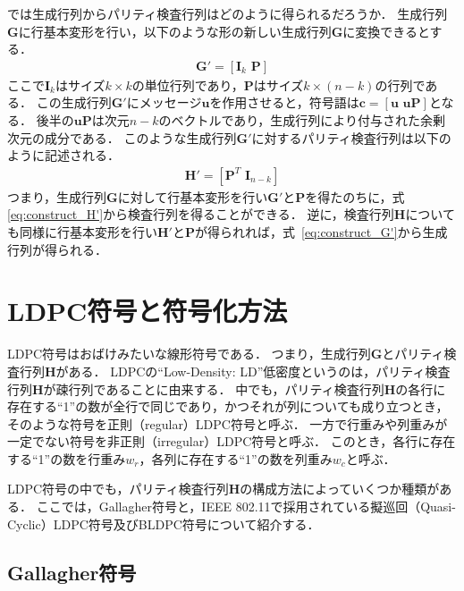 \documentclass[twocolumn, a4paper]{ieicejsp}
\begin{document}
では生成行列からパリティ検査行列はどのように得られるだろうか．
生成行列$\mathbf{G}$に行基本変形を行い，以下のような形の新しい生成行列$\mathbf{G}$に変換できるとする．
\begin{align}
  \mathbf{G}' = [\mathbf{I}_k \,\, \mathbf{P}] \label{eq:construct_G'}
\end{align}
ここで$\mathbf{I}_k$はサイズ$k \times k$の単位行列であり，$\mathbf{P}$はサイズ$k \times (n-k)$の行列である．
この生成行列$\mathbf{G}'$にメッセージ$\mathbf{u}$を作用させると，符号語は$\mathbf{c}=[\mathbf{u} \,\, \mathbf{u}\mathbf{P}]$となる．
後半の$\mathbf{u}\mathbf{P}$は次元$n-k$のベクトルであり，生成行列により付与された余剰次元の成分である．
このような生成行列$\mathbf{G}'$に対するパリティ検査行列は以下のように記述される．
\begin{align}
  \mathbf{H}' = [\mathbf{P}^T \,\, \mathbf{I}_{n-k}] \label{eq:construct_H'}
\end{align}
つまり，生成行列$\mathbf{G}$に対して行基本変形を行い$\mathbf{G}'$と$\mathbf{P}$を得たのちに，式\eqref{eq:construct_H'}から検査行列を得ることができる．
逆に，検査行列$\mathbf{H}$についても同様に行基本変形を行い$\mathbf{H}'$と$\mathbf{P}$が得られれば，式~\eqref{eq:construct_G'}から生成行列が得られる．



\section{LDPC符号と符号化方法}

LDPC符号はおばけみたいな線形符号である．
つまり，生成行列$\mathbf{G}$とパリティ検査行列$\mathbf{H}$がある．
LDPCの``Low-Density: LD''低密度というのは，パリティ検査行列$\mathbf{H}$が疎行列であることに由来する．
中でも，パリティ検査行列$\mathbf{H}$の各行に存在する``1''の数が全行で同じであり，かつそれが列についても成り立つとき，そのような符号を正則（regular）LDPC符号と呼ぶ．
一方で行重みや列重みが一定でない符号を非正則（irregular）LDPC符号と呼ぶ．
このとき，各行に存在する``1''の数を行重み$w_r$，各列に存在する``1''の数を列重み$w_c$と呼ぶ．

LDPC符号の中でも，パリティ検査行列$\mathbf{H}$の構成方法によっていくつか種類がある．
ここでは，Gallagher符号と，IEEE 802.11で採用されている擬巡回（Quasi-Cyclic）LDPC符号及びBLDPC符号について紹介する．


\subsection{Gallagher符号}
\end{document}
